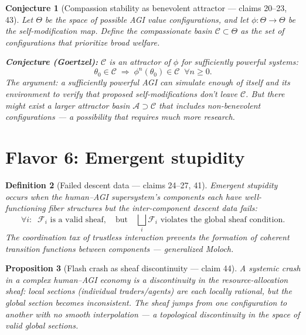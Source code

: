 \documentclass[11pt,a4paper]{article}
\newtheorem{definition}{Definition}[section]
\newtheorem{proposition}[definition]{Proposition}
\newtheorem{conjecture}[definition]{Conjecture}
\begin{document}
\begin{conjecture}[Compassion stability as benevolent attractor --- claims 20--23, 43]
\label{conj:attractor}
Let $\Theta$ be the space of possible AGI value configurations, and let
$\phi : \Theta \to \Theta$ be the self-modification map. Define the
\emph{compassionate basin} $\mathcal{C} \subset \Theta$ as the set of
configurations that prioritize broad welfare.

\textbf{Conjecture (Goertzel):} $\mathcal{C}$ is an attractor of $\phi$
for sufficiently powerful systems:
\[
  \theta_0 \in \mathcal{C} \;\Rightarrow\; \phi^n(\theta_0) \in \mathcal{C}
  \;\; \forall n \geq 0.
\]
The argument: a sufficiently powerful AGI can simulate enough of itself
and its environment to verify that proposed self-modifications don't leave
$\mathcal{C}$. But there might exist a larger attractor basin
$\mathcal{A} \supset \mathcal{C}$ that includes non-benevolent
configurations --- a possibility that requires much more research.
\end{conjecture}


\section{Flavor 6: Emergent stupidity}
\label{sec:emergent-stupid}

\begin{definition}[Failed descent data --- claims 24--27, 41]
\label{def:failed-descent}
\emph{Emergent stupidity} occurs when the human--AGI supersystem's
components each have well-functioning fiber structures but the
inter-component descent data fails:
\[
  \forall i: \;\; \mathcal{F}_i \text{ is a valid sheaf},
  \quad \text{but} \quad
  \bigsqcup_i \mathcal{F}_i \text{ violates the global sheaf condition}.
\]
The coordination tax of trustless interaction prevents the formation of
coherent transition functions between components --- generalized Moloch.
\end{definition}

\begin{proposition}[Flash crash as sheaf discontinuity --- claim 44]
\label{prop:flash}
A systemic crash in a complex human--AGI economy is a discontinuity in
the resource-allocation sheaf: local sections (individual traders/agents)
are each locally rational, but the global section becomes inconsistent.
The sheaf jumps from one configuration to another with no smooth
interpolation --- a topological discontinuity in the space of valid
global sections.
\end{proposition}
\end{document}
